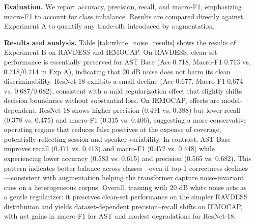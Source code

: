 \textbf{Evaluation.} We report accuracy, precision, recall, and macro-F1, emphasizing macro-F1 to account for class imbalance. Results are compared directly against Experiment A to quantify any trade-offs introduced by augmentation.

\textbf{Results and analysis.} Table \ref{tab:white_noise_results} shows the results of Experiment B on RAVDESS and IEMOCAP. On RAVDESS, clean-set performance is essentially preserved for AST Base (Acc 0.718, Macro-F1 0.713 vs. 0.718/0.714 in Exp A), indicating that 20 dB noise does not harm its clean discriminability. ResNet-18 exhibits a small decline (Acc 0.677, Macro-F1 0.674 vs. 0.687/0.682), consistent with a mild regularization effect that slightly shifts decision boundaries without substantial loss. On IEMOCAP, effects are model-dependent. ResNet-18 shows higher precision (0.491 vs. 0.388) but lower recall (0.378 vs. 0.475) and macro-F1 (0.315 vs. 0.406), suggesting a more conservative operating regime that reduces false positives at the expense of coverage, potentially reflecting session and speaker variability. In contrast, AST Base improves recall (0.471 vs. 0.413) and macro-F1 (0.472 vs. 0.448) while experiencing lower accuracy (0.583 vs. 0.615) and precision (0.565 vs. 0.682). This pattern indicates better balance across classes—even if top-1 correctness declines—consistent with augmentation helping the transformer capture noise-invariant cues on a heterogeneous corpus. Overall, training with 20 dB white noise acts as a gentle regularizer: it preserves clean-set performance on the simpler RAVDESS distribution and yields dataset-dependent precision–recall shifts on IEMOCAP, with net gains in macro-F1 for AST and modest degradations for ResNet-18.

\begin{table}[htbp]
    \centering
    \caption{ Results of Experiment B on two datasets }
    \label{tab:white_noise_results}
    \setlength{\tabcolsep}{5pt}
\end{table}



